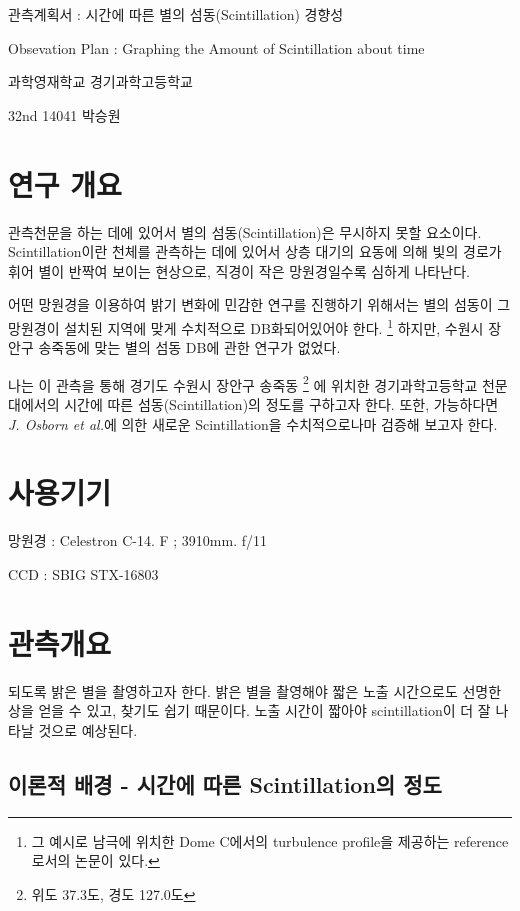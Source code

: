 \documentclass[11pt]{article}
\begin{document}
	\begin{center}
		\Large 관측계획서 : 시간에 따른 별의 섬동(Scintillation) 경향성
		
		\Large Obsevation Plan : Graphing the Amount of Scintillation about time
		\normalsize
		\begin{flushright}
			과학영재학교 경기과학고등학교
			
			32nd 14041 박승원
		\end{flushright}
	\end{center}
	\tableofcontents
	\listoffigures
	\clearpage
	\section{연구 개요}
	
	관측천문을 하는 데에 있어서 별의 섬동(Scintillation)은 무시하지 못할 요소이다. Scintillation이란 천체를 관측하는 데에 있어서 상층 대기의 요동에 의해 빛의 경로가 휘어 별이 반짝여 보이는 현상으로, 직경이 작은 망원경일수록 심하게 나타난다.
	
	어떤 망원경을 이용하여 밝기 변화에 민감한 연구를 진행하기 위해서는 별의 섬동이 그 망원경이 설치된 지역에 맞게 수치적으로 DB화되어있어야 한다.
	\footnote{그 예시로 남극에 위치한 Dome C에서의 turbulence profile을 제공하는 reference로서의 논문이 있다.\cite{ant_scin}}
	하지만, 수원시 장안구 송죽동에 맞는 별의 섬동 DB에 관한 연구가 없었다.
	
	나는 이 관측을 통해 경기도 수원시 장안구 송죽동
	\footnote{위도 37.3도, 경도 127.0도}
	에 위치한 경기과학고등학교 천문대에서의 시간에 따른 섬동(Scintillation)의 정도를 구하고자 한다. 또한, 가능하다면 \textit{J. Osborn et al.}에 의한 새로운 Scintillation을 수치적으로나마 검증해 보고자 한다.
	
	\section{사용기기}
	
	망원경 : Celestron C-14. F ; 3910mm. f/11
	
	CCD : SBIG STX-16803 \cite{ccd}
	
	\section{관측개요}
	되도록 밝은 별을 촬영하고자 한다. 밝은 별을 촬영해야 짧은 노출 시간으로도 선명한 상을 얻을 수 있고, 찾기도 쉽기 때문이다. 노출 시간이 짧아야 scintillation이 더 잘 나타날 것으로 예상된다. 
	
	\subsection{이론적 배경 - 시간에 따른 Scintillation의 정도} \label{exp_1}
	
\end{document}
